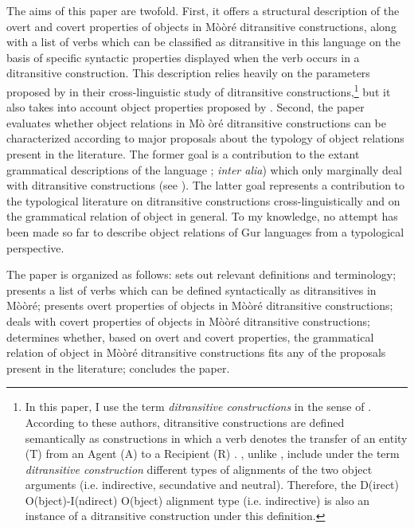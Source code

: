 \documentclass[output=paper]{langsci/langscibook}
\begin{document}
The aims of this paper are twofold. First, it offers a structural description of the overt and covert properties of objects in Mòòré ditransitive constructions, along with a list of verbs which can be classified as ditransitive in this language on the basis of specific syntactic properties displayed when the verb occurs in a ditransitive construction. This description relies heavily on the parameters proposed by \citet{malchukovetal2010} in their cross-linguistic study of ditransitive constructions,\footnote{In this paper, I use the term \textit{ditransitive constructions} in the sense of \citet{malchukovetal2010}. According to these authors, ditransitive constructions are defined semantically as constructions in which a verb denotes the transfer of an entity (T) from an Agent (A) to a Recipient (R) \citep[1]{malchukovetal2010}. \citet{malchukovetal2010}, unlike \citet{goldberg1995}, include under the term \textit{ditransitive construction} different types of alignments of the two object arguments (i.e. indirective, secundative and neutral). Therefore, the D(irect) O(bject)-I(ndirect) O(bject) alignment type (i.e. indirective) is also an instance of a ditransitive construction under this definition.} but it also takes into account object properties proposed by \citet{hymanduranti1982}. Second, the paper evaluates whether object relations in M\`{o }òré ditransitive constructions can be characterized according to major proposals about the typology of object relations present in the literature. The former goal is a contribution to the extant grammatical descriptions of the language \citealt{alexandre1953,canu1974,peterson1971,kouraogo1976,kabore1985}; \textit{inter alia}) which only marginally deal with ditransitive constructions (see \citealt{canu1974,kabore1985}). The latter goal represents a contribution to the typological literature on ditransitive constructions cross-linguistically and on the grammatical relation of object in general. To my knowledge, no attempt has been made so far to describe object relations of Gur languages from a typological perspective.  

The paper is organized as follows:  sets out relevant definitions and terminology;  presents a list of verbs which can be defined syntactically as ditransitives in Mòòré;  presents overt properties of objects in Mòòré ditransitive constructions;  deals with covert properties of objects in Mòòré ditransitive constructions;  determines whether, based on overt and covert properties, the grammatical relation of object in Mòòré ditransitive constructions fits any of the proposals present in the literature;  concludes the paper.    
\end{document}
